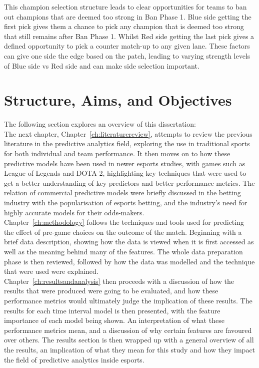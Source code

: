 This champion selection structure leads to clear opportunities for teams to ban out champions that are deemed too strong in Ban Phase 1.
Blue side getting the first pick gives them a chance to pick any champion that is deemed too strong that still remains after Ban Phase 1.
Whilst Red side getting the last pick gives a defined opportunity to pick a counter match-up to any given lane.
These factors can give one side the edge based on the \Gls{patch}, leading to varying strength levels of Blue side vs Red side and can make side selection important.

\section{Structure, Aims, and Objectives}\label{sec:Structure, Aims, and Objectives}

The following section explores an overview of this dissertation: \\

The next chapter, Chapter~\ref{ch:literaturereview}, attempts to review the previous literature in the predictive analytics field, exploring the use in traditional sports for both individual and team performance.
It then moves on to how these predictive models have been used in newer esports studies, with games such as League of Legends and DOTA 2, highlighting key techniques that were used to get a better understanding of key predictors and better performance metrics.
The relation of commercial predictive models were briefly discussed in the betting industry with the popularisation of esports betting, and the industry's need for highly accurate models for their odds-makers. \\

Chapter~\ref{ch:methodology} follows the techniques and tools used for predicting the effect of pre-game choices on the outcome of the match.
Beginning with a brief data description, showing how the data is viewed when it is first accessed as well as the meaning behind many of the features.
The whole data preparation phase is then reviewed, followed by how the data was modelled and the technique that were used were explained. \\

Chapter~\ref{ch:resultsandanalysis} then proceeds with a discussion of how the results that were produced were going to be evaluated, and how these performance metrics would ultimately judge the implication of these results.
The results for each time interval model is then presented, with the feature importance of each model being shown.
An interpretation of what these performance metrics mean, and a discussion of why certain features are favoured over others.
The results section is then wrapped up with a general overview of all the results, an implication of what they mean for this study and how they impact the field of predictive analytics inside esports. \\

